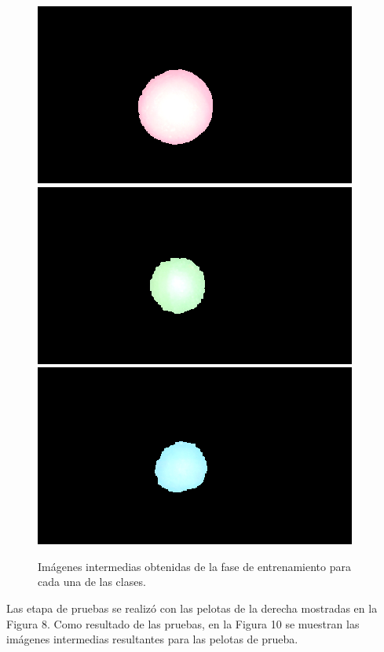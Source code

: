 \documentclass[conference]{IEEEtran}
\begin{document}
\begin{figure}[h]
	\setlength{\unitlength}{0.0105in}
	\centering
	\includegraphics[scale=0.41]{./images/classRed.png}
	\includegraphics[scale=0.41]{./images/classGreen.png}
	\includegraphics[scale=0.41]{./images/classBlue.png}
	\caption{ Im\'agenes intermedias obtenidas de la fase de entrenamiento para cada una de las clases. }	
\end{figure}

Las etapa de pruebas se realiz\'o con las pelotas de la derecha mostradas en la Figura 8. Como resultado de las pruebas, en la Figura 10 se muestran las im\'agenes intermedias resultantes para las pelotas de prueba.
\end{document}
